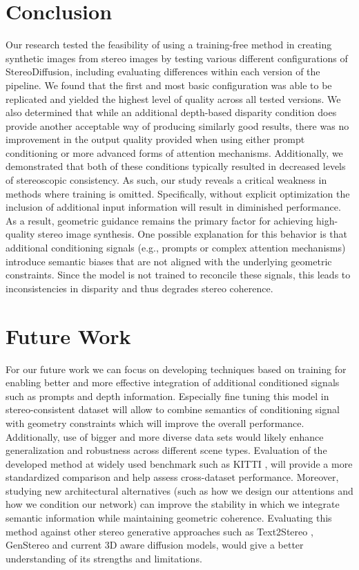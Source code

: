 \section{Conclusion}
Our research tested the feasibility of using a training-free method in creating synthetic images from stereo images by testing various different configurations of StereoDiffusion, including evaluating differences within each version of the pipeline.
We found that the first and most basic configuration was able to be replicated and yielded the highest level of quality across all tested versions. We also determined that while an additional depth-based disparity condition does provide another acceptable way of producing similarly good results, there was no improvement in the output quality provided when using either prompt conditioning or more advanced forms of attention mechanisms. Additionally, we demonstrated that both of these conditions typically resulted in decreased levels of stereoscopic consistency.
As such, our study reveals a critical weakness in methods where training is omitted. Specifically, without explicit optimization the inclusion of additional input information will result in diminished performance. As a result, geometric guidance remains the primary factor for achieving high-quality stereo image synthesis. One possible explanation for this behavior is that additional conditioning signals (e.g., prompts or complex attention mechanisms) introduce semantic biases that are not aligned with the underlying geometric constraints. Since the model is not trained to reconcile these signals, this leads to inconsistencies in disparity and thus degrades stereo coherence.



\section{Future Work}
For our future work we can focus on developing techniques based on training for enabling better and more effective integration of additional conditioned signals such as prompts and depth information. Especially fine tuning this model in stereo-consistent dataset will allow to combine semantics of conditioning signal with geometry constraints which will improve the overall performance. Additionally, use of bigger and more diverse data sets would likely enhance generalization and robustness across different scene types. Evaluation of the developed method at widely used benchmark such as KITTI \citep{6248074}, will provide a more standardized comparison and help assess cross-dataset performance.
Moreover, studying new architectural alternatives (such as how we design our attentions and how we condition our network) can improve the stability in which we integrate semantic information while maintaining geometric coherence. Evaluating this method against other stereo generative approaches such as Text2Stereo \citep{garg2025text2stereo}, GenStereo \citep{qiao2025towards} and current 3D aware diffusion models, would give a better understanding of its strengths and limitations.